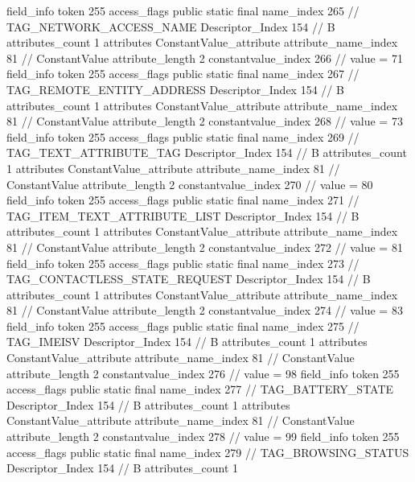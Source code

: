 {{{{{{{				}
				}
			}
			field_info {
				token	255
				access_flags	public static final
				name_index	265		// TAG_NETWORK_ACCESS_NAME
				Descriptor_Index	154		// B
				attributes_count	1
				attributes {
				ConstantValue_attribute {
					attribute_name_index	81		// ConstantValue
					attribute_length	2
					constantvalue_index	266		// value = 71
				}
				}
			}
			field_info {
				token	255
				access_flags	public static final
				name_index	267		// TAG_REMOTE_ENTITY_ADDRESS
				Descriptor_Index	154		// B
				attributes_count	1
				attributes {
				ConstantValue_attribute {
					attribute_name_index	81		// ConstantValue
					attribute_length	2
					constantvalue_index	268		// value = 73
				}
				}
			}
			field_info {
				token	255
				access_flags	public static final
				name_index	269		// TAG_TEXT_ATTRIBUTE_TAG
				Descriptor_Index	154		// B
				attributes_count	1
				attributes {
				ConstantValue_attribute {
					attribute_name_index	81		// ConstantValue
					attribute_length	2
					constantvalue_index	270		// value = 80
				}
				}
			}
			field_info {
				token	255
				access_flags	public static final
				name_index	271		// TAG_ITEM_TEXT_ATTRIBUTE_LIST
				Descriptor_Index	154		// B
				attributes_count	1
				attributes {
				ConstantValue_attribute {
					attribute_name_index	81		// ConstantValue
					attribute_length	2
					constantvalue_index	272		// value = 81
				}
				}
			}
			field_info {
				token	255
				access_flags	public static final
				name_index	273		// TAG_CONTACTLESS_STATE_REQUEST
				Descriptor_Index	154		// B
				attributes_count	1
				attributes {
				ConstantValue_attribute {
					attribute_name_index	81		// ConstantValue
					attribute_length	2
					constantvalue_index	274		// value = 83
				}
				}
			}
			field_info {
				token	255
				access_flags	public static final
				name_index	275		// TAG_IMEISV
				Descriptor_Index	154		// B
				attributes_count	1
				attributes {
				ConstantValue_attribute {
					attribute_name_index	81		// ConstantValue
					attribute_length	2
					constantvalue_index	276		// value = 98
				}
				}
			}
			field_info {
				token	255
				access_flags	public static final
				name_index	277		// TAG_BATTERY_STATE
				Descriptor_Index	154		// B
				attributes_count	1
				attributes {
				ConstantValue_attribute {
					attribute_name_index	81		// ConstantValue
					attribute_length	2
					constantvalue_index	278		// value = 99
				}
				}
			}
			field_info {
				token	255
				access_flags	public static final
				name_index	279		// TAG_BROWSING_STATUS
				Descriptor_Index	154		// B
				attributes_count	1
}}}}}
